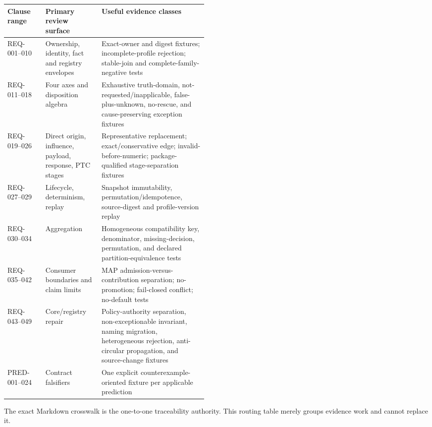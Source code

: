 \documentclass[10pt]{article}
\begin{document}
\begin{tabularx}{\linewidth}{@{}p{0.19\linewidth}p{0.28\linewidth}X@{}}
\toprule
Clause range & Primary review surface & Useful evidence classes \\
\midrule
REQ-001--010 & Ownership, identity, fact and registry envelopes & Exact-owner
and digest fixtures; incomplete-profile rejection; stable-join and
complete-family-negative tests \\
REQ-011--018 & Four axes and disposition algebra & Exhaustive truth-domain,
not-requested/inapplicable, false-plus-unknown, no-rescue, and
cause-preserving exception fixtures \\
REQ-019--026 & Direct origin, influence, payload, response, PTC stages &
Representative replacement; exact/conservative edge; invalid-before-numeric;
package-qualified stage-separation fixtures \\
REQ-027--029 & Lifecycle, determinism, replay & Snapshot immutability,
permutation/idempotence, source-digest and profile-version replay \\
REQ-030--034 & Aggregation & Homogeneous compatibility key, denominator,
missing-decision, permutation, and declared partition-equivalence tests \\
REQ-035--042 & Consumer boundaries and claim limits & MAP admission-versus-
contribution separation; no-promotion; fail-closed conflict; no-default tests \\
REQ-043--049 & Core/registry repair & Policy-authority separation,
non-exceptionable invariant, naming migration, heterogeneous rejection,
anti-circular propagation, and source-change fixtures \\
PRED-001--024 & Contract falsifiers & One explicit counterexample-oriented
fixture per applicable prediction \\
\bottomrule
\end{tabularx}

The exact Markdown crosswalk is the one-to-one traceability authority. This
routing table merely groups evidence work and cannot replace it.
\end{document}
